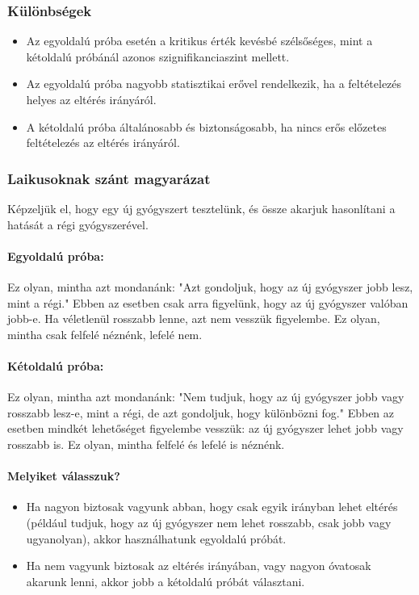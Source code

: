 \documentclass[a4paper,12pt]{article}
\begin{document}
    \subsubsection{Különbségek}
    \begin{itemize}
        \item Az egyoldalú próba esetén a kritikus érték kevésbé szélsőséges, mint a kétoldalú próbánál azonos szignifikanciaszint mellett.
        \item Az egyoldalú próba nagyobb statisztikai erővel rendelkezik, ha a feltételezés helyes az eltérés irányáról.
        \item A kétoldalú próba általánosabb és biztonságosabb, ha nincs erős előzetes feltételezés az eltérés irányáról.
    \end{itemize}

    \subsubsection{Laikusoknak szánt magyarázat}

    Képzeljük el, hogy egy új gyógyszert tesztelünk, és össze akarjuk hasonlítani a hatását a régi gyógyszerével.

    \paragraph{Egyoldalú próba:}
    Ez olyan, mintha azt mondanánk: "Azt gondoljuk, hogy az új gyógyszer jobb lesz, mint a régi." Ebben az esetben csak arra figyelünk, hogy az új gyógyszer valóban jobb-e. Ha véletlenül rosszabb lenne, azt nem vesszük figyelembe. Ez olyan, mintha csak felfelé néznénk, lefelé nem.

    \paragraph{Kétoldalú próba:}
    Ez olyan, mintha azt mondanánk: "Nem tudjuk, hogy az új gyógyszer jobb vagy rosszabb lesz-e, mint a régi, de azt gondoljuk, hogy különbözni fog." Ebben az esetben mindkét lehetőséget figyelembe vesszük: az új gyógyszer lehet jobb vagy rosszabb is. Ez olyan, mintha felfelé és lefelé is néznénk.

    \paragraph{Melyiket válasszuk?}
    \begin{itemize}
        \item Ha nagyon biztosak vagyunk abban, hogy csak egyik irányban lehet eltérés (például tudjuk, hogy az új gyógyszer nem lehet rosszabb, csak jobb vagy ugyanolyan), akkor használhatunk egyoldalú próbát.
        \item Ha nem vagyunk biztosak az eltérés irányában, vagy nagyon óvatosak akarunk lenni, akkor jobb a kétoldalú próbát választani.
    \end{itemize}
\end{document}
